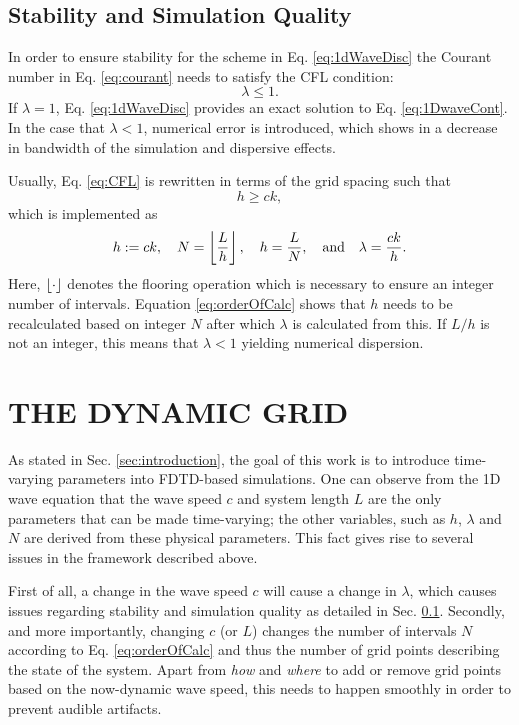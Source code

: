 \documentclass[fleqn]{jaes}
\begin{document}
\subsection{Stability and Simulation Quality}\label{sec:quality}
In order to ensure stability for the scheme in Eq. \eqref{eq:1dWaveDisc} the Courant number in Eq. \eqref{eq:courant} needs to satisfy the CFL condition:
\begin{equation}\label{eq:CFL}
    \lambda \leq 1.
\end{equation}
%
If $\lambda = 1$, Eq. \eqref{eq:1dWaveDisc} provides an exact solution to Eq. \eqref{eq:1DwaveCont}. In the case that $\lambda < 1$, numerical error is introduced, which shows in a decrease in bandwidth of the simulation and dispersive effects. 

Usually, Eq. \eqref{eq:CFL} is rewritten in terms of the grid spacing such that
\begin{equation}\label{eq:stabilityCond}
    h \geq c k,
\end{equation}
which is implemented as
\begin{equation}\label{eq:orderOfCalc}
    h:=ck, \quad N = \floor[\frac{L}{h}],\quad h = \frac{L}{N},\qaq \lambda = \frac{ck}{h}.
\end{equation}
Here, $\floor[\cdot]$ denotes the flooring operation which is necessary to ensure an integer number of intervals. Equation \eqref{eq:orderOfCalc} shows that $h$ needs to be recalculated based on integer $N$ after which $\lambda$ is calculated from this. If $L/h$ is not an integer, this means that $\lambda < 1$ yielding numerical dispersion. 

\section{THE DYNAMIC GRID}\label{sec:dynamicGrid}
As stated in Sec. \ref{sec:introduction}, the goal of this work is to introduce time-varying parameters into FDTD-based simulations. 
One can observe from the 1D wave equation that the wave speed $c$ and system length $L$ are the only parameters that can be made time-varying; the other variables, such as $h$, $\lambda$ and $N$ are derived from these physical parameters. This fact gives rise to several issues in the framework described above. 

First of all, a change in the wave speed $c$ will cause a change in $\lambda$, which causes issues regarding stability and simulation quality as detailed in Sec. \ref{sec:quality}. Secondly, and more importantly, changing $c$ (or $L$) changes the number of intervals $N$ according to Eq. \eqref{eq:orderOfCalc} and thus the number of grid points describing the state of the system. Apart from \textit{how} and \textit{where} to add or remove grid points based on the now-dynamic wave speed, this needs to happen smoothly in order to prevent audible artifacts. %
\end{document}
